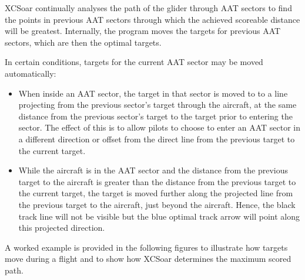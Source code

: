 \documentclass[a4paper,12pt]{refrep}
\begin{document}
XCSoar continually analyses the path of the glider through AAT sectors
to find the points in previous AAT sectors through which the achieved
scoreable distance will be greatest.  Internally, the program moves
the targets for previous AAT sectors, which are then the optimal
targets.

In certain conditions, targets for the current AAT sector may be moved
automatically:
\begin{itemize}
\item When inside an AAT sector, the target in that sector is moved to
to a line projecting from the previous sector's target through the
aircraft, at the same distance from the previous sector's target to
the target prior to entering the sector.  The effect of this is to
allow pilots to choose to enter an AAT sector in a different direction
or offset from the direct line from the previous target to the current
target.

\item While the aircraft is in the AAT sector and the distance from the
previous target to the aircraft is greater than the distance from the
previous target to the current target, the target is moved further
along the projected line from the previous target to the aircraft,
just beyond the aircraft.  Hence, the black track line will not be
visible but the blue optimal track arrow will point along this
projected direction.
\end{itemize}

A worked example is provided in the following figures to illustrate
how targets move during a flight and to show how XCSoar determines the
maximum scored path.
\end{document}
